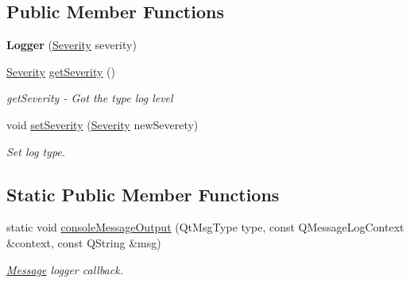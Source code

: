 \subsection*{Public Member Functions}
\begin{DoxyCompactItemize}
\item 
\mbox{\label{classeven_1_1_logger_a4dd8f8d34117f1ac13d0f72e7ad7cf55}} 
{\bfseries Logger} (\mbox{\hyperlink{classeven_1_1_logger_adac430b7650d87ac25ace824917d66cf}{Severity}} severity)
\item 
\mbox{\hyperlink{classeven_1_1_logger_adac430b7650d87ac25ace824917d66cf}{Severity}} \mbox{\hyperlink{classeven_1_1_logger_a8aa6bfc4490b9cff931d5d809f146136}{get\+Severity}} ()
\begin{DoxyCompactList}\small\item\em get\+Severity -\/ Got the type log level \end{DoxyCompactList}\item 
\mbox{\label{classeven_1_1_logger_ab338881066760d6d309f21e984703cac}} 
void \mbox{\hyperlink{classeven_1_1_logger_ab338881066760d6d309f21e984703cac}{set\+Severity}} (\mbox{\hyperlink{classeven_1_1_logger_adac430b7650d87ac25ace824917d66cf}{Severity}} new\+Severety)
\begin{DoxyCompactList}\small\item\em Set log type. \end{DoxyCompactList}\end{DoxyCompactItemize}
\subsection*{Static Public Member Functions}
\begin{DoxyCompactItemize}
\item 
\mbox{\label{classeven_1_1_logger_a8869f9a06b7b6103328d1cf2e787bb23}} 
static void \mbox{\hyperlink{classeven_1_1_logger_a8869f9a06b7b6103328d1cf2e787bb23}{console\+Message\+Output}} (Qt\+Msg\+Type type, const Q\+Message\+Log\+Context \&context, const Q\+String \&msg)
\begin{DoxyCompactList}\small\item\em \mbox{\hyperlink{classeven_1_1_logger_1_1_message}{Message}} logger callback. \end{DoxyCompactList}\end{DoxyCompactItemize}
